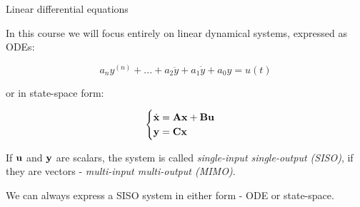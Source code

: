 \documentclass{beamer}
\begin{document}
\begin{frame}{Linear differential equations}
\begin{flushleft}

In this course we will focus entirely on linear dynamical systems, expressed as ODEs:

\begin{equation}
    a_n y^{(n)} +
    ... +
    a_2 \ddot{y} + a_1 \dot{y} + 
    a_0 y = u(t)
\end{equation}

or in state-space form:

\begin{equation}
	\begin{cases}
		\dot{\mathbf{x}} = \mathbf{A} \mathbf{x} + \mathbf{B}\mathbf{u} \\
		\mathbf{y} = \mathbf{C}\mathbf{x}
	\end{cases}
\end{equation}

If $\mathbf{u}$ and $\mathbf{y}$ are scalars, the system is called \emph{single-input single-output (SISO)}, if they are vectors - \emph{multi-input multi-output (MIMO)}.

\bigskip

We can always express a SISO system in either form - ODE or state-space.

\end{flushleft}
\end{frame}
\end{document}
